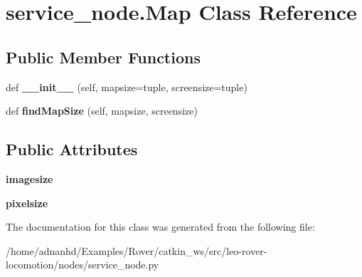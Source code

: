\hypertarget{classservice__node_1_1Map}{}\section{service\+\_\+node.\+Map Class Reference}
\label{classservice__node_1_1Map}
\subsection*{Public Member Functions}
\begin{DoxyCompactItemize}
\item 
\mbox{\label{classservice__node_1_1Map_a1b0e6019abf3887e0b90de4b105d8efa}} 
def {\bfseries \+\_\+\+\_\+init\+\_\+\+\_\+} (self, mapsize=tuple, screensize=tuple)
\item 
\mbox{\label{classservice__node_1_1Map_a8a80afce7e071ca6e3671930c287dd3f}} 
def {\bfseries find\+Map\+Size} (self, mapsize, screensize)
\end{DoxyCompactItemize}
\subsection*{Public Attributes}
\begin{DoxyCompactItemize}
\item 
\mbox{\label{classservice__node_1_1Map_a5912644f0257a5ac29f643b03187559c}} 
{\bfseries imagesize}
\item 
\mbox{\label{classservice__node_1_1Map_a2a5109757bb8374ae6783a888c0cc7ec}} 
{\bfseries pixelsize}
\end{DoxyCompactItemize}


The documentation for this class was generated from the following file\+:\begin{DoxyCompactItemize}
\item 
/home/adnanhd/\+Examples/\+Rover/catkin\+\_\+ws/src/leo-\/rover-\/locomotion/nodes/service\+\_\+node.\+py\end{DoxyCompactItemize}
